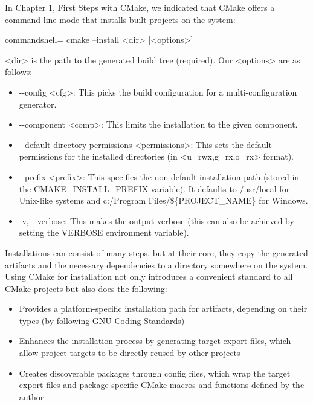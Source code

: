 
In Chapter 1, First Steps with CMake, we indicated that CMake offers a command-line mode that installs built projects on the system:

\begin{tcblisting}{commandshell={}}
cmake --install <dir> [<options>]
\end{tcblisting}

<dir> is the path to the generated build tree (required). Our <options> are as follows:

\begin{itemize}
\item 
-{}-config <cfg>: This picks the build configuration for a multi-configuration generator.

\item 
-{}-component <comp>: This limits the installation to the given component.

\item 
-{}-default-directory-permissions <permissions>: This sets the default permissions for the installed directories (in <u=rwx,g=rx,o=rx> format).

\item 
-{}-prefix <prefix>: This specifies the non-default installation path (stored in the CMAKE\_INSTALL\_PREFIX variable). It defaults to /usr/local for Unix-like systems and c:/Program Files/\$\{PROJECT\_NAME\} for Windows.

\item 
-v, -{}-verbose: This makes the output verbose (this can also be achieved by setting the VERBOSE environment variable).
\end{itemize}

Installations can consist of many steps, but at their core, they copy the generated artifacts and the necessary dependencies to a directory somewhere on the system. Using CMake for installation not only introduces a convenient standard to all CMake projects but also does the following:

\begin{itemize}
\item 
Provides a platform-specific installation path for artifacts, depending on their types (by following GNU Coding Standards)

\item 
Enhances the installation process by generating target export files, which allow project targets to be directly reused by other projects

\item 
Creates discoverable packages through config files, which wrap the target export files and package-specific CMake macros and functions defined by the author
\end{itemize}

